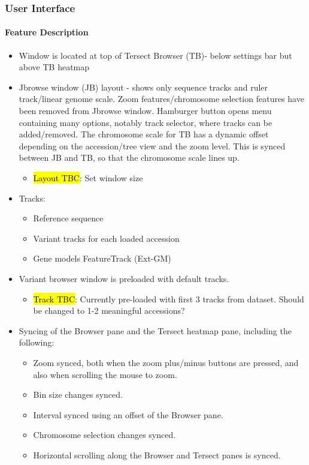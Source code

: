 \documentclass[12pt]{article}
\begin{document}
\subsubsection{User Interface}

\paragraph{Feature Description}
\begin{itemize}
    \item Window is located at top of Tersect Browser (TB)- below settings bar but above TB heatmap 
    \item Jbrowse window (JB) layout - shows only sequence tracks and ruler track/linear genome scale. Zoom features/chromosome selection features have been removed from Jbrowse window. Hamburger button opens menu containing many options, notably track selector, where tracks can be added/removed. The chromosome scale for TB has a dynamic offset depending on the accession/tree view and the zoom level. This is synced between JB and TB, so that the chromosome scale lines up. 
    \begin{itemize}
        \item \hl{Layout TBC}: Set window size
    \end{itemize}
    \item Tracks:
    \begin{itemize}
        \item Reference sequence 
        \item Variant tracks for each loaded accession
        \item Gene models FeatureTrack (Ext-GM) 
    \end{itemize}
    \item Variant browser window is preloaded with default tracks. 
    \begin{itemize}
        \item \hl{Track TBC}: Currently pre-loaded with first 3 tracks from dataset. Should be changed to 1-2 meaningful accessions?
    \end{itemize}
    \item Syncing of the Browser pane and the Tersect heatmap pane, including the following:
    \begin{itemize}
        \item Zoom synced, both when the zoom plus/minus buttons are pressed, and also when scrolling the mouse to zoom. 
        \item Bin size changes synced.
        \item Interval synced using an offset of the Browser pane.
        \item Chromosome selection changes synced.
        \item Horizontal scrolling along the Browser and Tersect panes is synced.
    \end{itemize}
\end{itemize}
    
\end{document}
